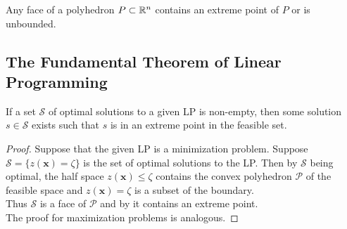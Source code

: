 \begin{lemma}\label{face}
Any face of a polyhedron $P\subset \mathbb{R}^n$ contains an extreme point of $P$ or is unbounded.
\iffalse
\begin{proof}
The intersection of two faces is itself a face of $P$ since the intersection is on the boundary and intersects the half-space defined by $g_1(x)+g_2(x)\geq b_1+b_2$ where $g_1(x) \geq b_1$ and $g_2(x) \geq b_2$ are the inequalities defining the half-spaces intersecting each of the two faces. Thus an extreme point is a face in itself and is contained in all faces that intersect in that point. If a face contains no extreme points it is unbounded on at least one coordinate, since at most $n-1$ of the half-spaces bounding $P$ intersect in any point of the face.
\end{proof}
\fi
\end{lemma}
\subsection{The Fundamental Theorem of Linear Programming}
\begin{theorem}\label{extreme point}
If a set $\mathcal{S}$ of optimal solutions to a given LP is non-empty, then some solution $s\in \mathcal{S}$ exists such that $s$ is in an extreme point in the feasible set.
\begin{proof}
Suppose that the given LP is a minimization problem. Suppose $\mathcal{S} =\{z(\textbf{x})= \zeta \}$ is the set of optimal solutions to the LP. Then by $\mathcal{S}$ being optimal, the half space $z(\textbf{x}) \leq \zeta$ contains the convex polyhedron $\mathcal{P}$ of the feasible space and $z(\textbf{x})= \zeta$ is a subset of the boundary.\\
Thus $\mathcal{S}$ is a face of $\mathcal{P}$ and by  it contains an extreme point.\\
The proof for maximization problems is analogous.
\end{proof}
\end{theorem}
